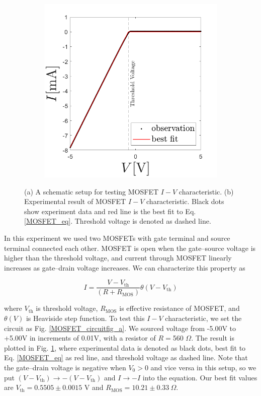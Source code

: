 \documentclass[%
 aip,
amsmath,amssymb,
reprint,
]{revtex4-1}
\begin{document}
\begin{figure}[!htbp]
  \begin{subfigure}{0.23\textwidth}
    \includegraphics[width=\linewidth]{figures/MOSFETIV.png}
    \caption{}
    \label{MOSFET_circuitfig_b}
  \end{subfigure}

\caption{(a) A schematic setup for testing MOSFET $I-V$ characteristic. (b) Experimental result of MOSFET $I-V$ characteristic. Black dots show experiment data and red line is the best fit to Eq. \ref{MOSFET_eq}. Threshold voltage is denoted as dashed line.} \label{MOSFET_circuitfig}
\end{figure}

In this experiment we used two MOSFETs with gate terminal and source terminal connected each other.
MOSFET is open when the gate--source voltage is higher than the threshold voltage, and current through MOSFET linearly increases as gate--drain voltage increases.
We can characterize this property as

\begin{equation}
I=\frac{V-V_{\textrm{th}}}{(R+R_{\textrm{MOS}})}\theta(V-V_{\textrm{th}})
\label{MOSFET_eq}
\end{equation}

\noindent where $V_{\textrm{th}}$ is threshold voltage, $R_{\textrm{MOS}}$ is effective resistance of MOSFET, and $\theta(V)$ is Heaviside step function.
To test this $I-V$ characteristic, we set the circuit as Fig. \ref{MOSFET_circuitfig_a}.
We sourced voltage from -5.00V to +5.00V in increments of 0.01V, with a resistor of $R=$560 $\Omega$.
The result is plotted in Fig. \ref{MOSFET_circuitfig_b}, where experimental data is denoted as black dots, best fit to Eq. \ref{MOSFET_eq} as red line, and threshold voltage as dashed line.
Note that the gate--drain voltage is negative when $V_{0}>0$ and vice versa in this setup, so we put $(V-V_{\textrm{th}})\rightarrow-(V-V_{\textrm{th}})$ and $I\rightarrow -I$ into the equation.
Our best fit values are $V_{\textrm{th}}=0.5505\pm0.0015$ V and $R_{\textrm{MOS}}=10.21\pm0.33\>\Omega$.
\end{document}
